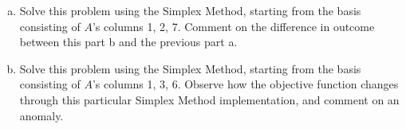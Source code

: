 \documentclass{article}
\begin{document}
\begin{enumerate}[1:]
\begin{enumerate}[a)]
			\item Solve this problem using the Simplex Method, starting from the basis consisting of $A$'s columns 1, 2, 7. Comment on the difference in outcome between this part b and the previous part a.

			\item Solve this problem using the Simplex Method, starting from the basis consisting of $A$'s columns 1, 3, 6. Observe how the objective function changes through this particular Simplex Method implementation, and comment on an anomaly.
				
		\end{enumerate}
\end{enumerate}
\end{document}
